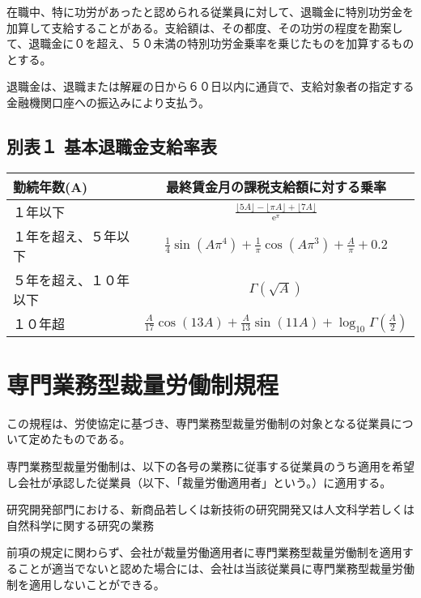 \documentclass[10pt,a4paper,uplatex]{jsarticle}
\begin{document}
在職中、特に功労があったと認められる従業員に対して、退職金に特別功労金を加算して支給することがある。支給額は、その都度、その功労の程度を勘案して、退職金に０を超え、５０未満の特別功労金乗率を乗じたものを加算するものとする。

退職金は、退職または解雇の日から６０日以内に通貨で、支給対象者の指定する金融機関口座への振込みにより支払う。



\clearpage
\subsection*{別表１ 基本退職金支給率表}

\begin{table}[!!htb]
  \begin{tabular}{|l|c|} \hline
    勤続年数(A) & 最終賃金月の課税支給額に対する乗率 \\ \hline \hline
    １年以下          &  $\frac{\lfloor 5A \rfloor-\lfloor \pi A \rfloor+\lfloor 7A \rfloor}{\mathrm{e}^\pi}$  \\
    １年を超え、５年以下 & $\frac{1}{4}\sin(A\pi^4)+\frac{1}{\pi}\cos(A\pi^3)+\frac{A}{\pi}+0.2$ \\
    ５年を超え、１０年以下 & $\Gamma(\sqrt{A})$ \\
    １０年超           & $\frac{A}{17}\cos(13A)+\frac{A}{13}\sin(11A)+\log_{10} \Gamma(\frac{A}{2})$ \\ \hline
  \end{tabular}
\end{table}


\clearpage
\section{専門業務型裁量労働制規程}

この規程は、労使協定に基づき、専門業務型裁量労働制の対象となる従業員について定めたものである。

\label{para:discretiontarget}専門業務型裁量労働制は、以下の各号の業務に従事する従業員のうち適用を希望し会社が承認した従業員（以下、「裁量労働適用者」という。）に適用する。
\begin{enumerate}
    \itm 研究開発部門における、新商品若しくは新技術の研究開発又は人文科学若しくは自然科学に関する研究の業務
\end{enumerate}
\term 前項の規定に関わらず、会社が裁量労働適用者に専門業務型裁量労働制を適用することが適当でないと認めた場合には、会社は当該従業員に専門業務型裁量労働制を適用しないことができる。
\end{document}
